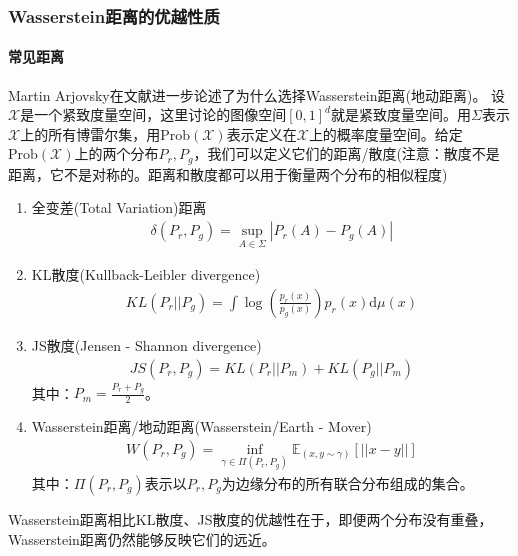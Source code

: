         \subsubsection{Wasserstein距离的优越性质}
            \paragraph{常见距离}
            Martin Arjovsky在文献\cite{2017.Chen}进一步论述了为什么选择Wasserstein距离(地动距离)。
            设$\mathcal{X}$是一个紧致度量空间，这里讨论的图像空间$[0,1]^d$就是紧致度量空间。用$\Sigma$表示$\mathcal{X}$上的所有博雷尔集，用$\mathrm{Prob}(\mathcal{X})$表示定义在$\mathcal{X}$上的概率度量空间。给定$\mathrm{Prob}(\mathcal{X})$上的两个分布$P_r,P_g$，我们可以定义它们的距离/散度(注意：散度不是距离，它不是对称的。距离和散度都可以用于衡量两个分布的相似程度)
            \begin{enumerate}
            \item 全变差(Total Variation)距离
            \begin{align*}
            \delta(P_r,P_g) = \sup_{A\in \Sigma}|P_r(A)-P_g(A)|
            \end{align*}
            \item KL散度(Kullback-Leibler divergence)
            \begin{align*}
            KL(P_r||P_g) = \int \log \left( \frac{p_r(x)}{p_g(x)} \right) p_r(x)\mathrm{d}\mu(x)
            \end{align*}
            \item JS散度(Jensen - Shannon divergence)
            \begin{align*}
            JS(P_r,P_g) = KL(P_r||P_m) + KL(P_g||P_m)
            \end{align*}
            其中：$P_m = \frac{P_r+P_g}{2}$。
            \item Wasserstein距离/地动距离(Wasserstein/Earth - Mover)
            \begin{align}
            \label{eq:Wasserstein距离}
            W(P_r,P_g) = \inf_{\gamma\in \Pi(P_r,P_g)}\mathbb{E}_{(x,y\sim \gamma)}[||x-y||]
            \end{align}
            其中：$\Pi(P_r,P_g)$表示以$P_r,P_g$为边缘分布的所有联合分布组成的集合。
            \end{enumerate}
            \par
            Wasserstein距离相比KL散度、JS散度的优越性在于，即便两个分布没有重叠，Wasserstein距离仍然能够反映它们的远近。
            \par
